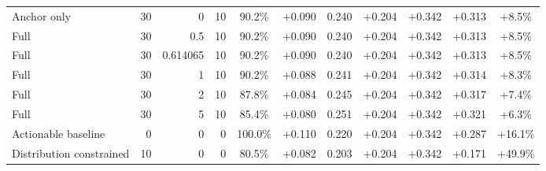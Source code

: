 \begin{table}[htbp]
\begin{tabular}{lrrrccccccc}
Anchor only & 30 & 0 & 10 & 90.2\% & +0.090 & 0.240 & +0.204 & +0.342 & +0.313 & +8.5\% \\
Full & 30 & 0.5 & 10 & 90.2\% & +0.090 & 0.240 & +0.204 & +0.342 & +0.313 & +8.5\% \\
Full & 30 & 0.614065 & 10 & 90.2\% & +0.090 & 0.240 & +0.204 & +0.342 & +0.313 & +8.5\% \\
Full & 30 & 1 & 10 & 90.2\% & +0.088 & 0.241 & +0.204 & +0.342 & +0.314 & +8.3\% \\
Full & 30 & 2 & 10 & 87.8\% & +0.084 & 0.245 & +0.204 & +0.342 & +0.317 & +7.4\% \\
Full & 30 & 5 & 10 & 85.4\% & +0.080 & 0.251 & +0.204 & +0.342 & +0.321 & +6.3\% \\
Actionable baseline & 0 & 0 & 0 & 100.0\% & +0.110 & 0.220 & +0.204 & +0.342 & +0.287 & +16.1\% \\
Distribution constrained & 10 & 0 & 0 & 80.5\% & +0.082 & 0.203 & +0.204 & +0.342 & +0.171 & +49.9\% \\
\bottomrule
\end{tabular}
\end{table}